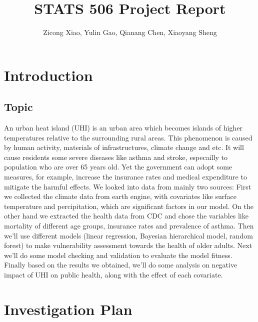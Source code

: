 \documentclass{article}
\title{STATS 506 Project Report} %
\author{Zicong Xiao, Yulin Gao, Qianang Chen, Xiaoyang Sheng}
\begin{document}
\maketitle %





\section{Introduction}
\subsection{Topic}
An urban heat island (UHI) is an urban area which becomes islands of higher temperatures relative to the surrounding rural areas. This phenomenon is caused by human activity, materials of infrastructures, climate change and etc. It will cause residents some severe diseases like asthma and stroke, especailly to population who are over 65 years old. Yet the government can adopt some measures, for example, increase the insurance rates and medical expenditure to mitigate the harmful effects. We looked into data from mainly two sources: First we collected the climate data from earth engine, with covariates like surface temperature and percipitation, which are significant factors in our model. On the other hand we extracted the health data from CDC and chose the variables like mortality of different age groups, insurance rates and prevalence of asthma. Then we'll use different models (linear regression, Bayesian hierarchical model, random forest) to make vulnerability assessment towards the health of older adults. Next we'll do some model checking and validation to evaluate the model fitness. Finally based on the results we obtained, we'll do some analysis on negative impact of UHI on public health, along with the effect of each covariate.
\section{Investigation Plan}
\end{document}
